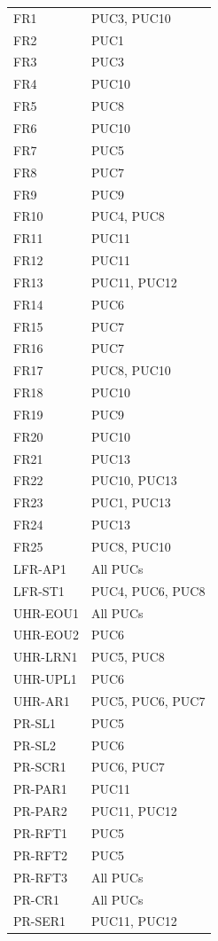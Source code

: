 \documentclass[12pt]{article}
\begin{document}
\begin{longtable}{p{2.5cm}p{11cm}}
    FR1 & PUC3, PUC10 \\
    FR2 & PUC1 \\
    FR3 & PUC3 \\
    FR4 & PUC10 \\
    FR5 & PUC8 \\
    FR6 & PUC10 \\
    FR7 & PUC5 \\
    FR8 & PUC7 \\
    FR9 & PUC9 \\
    FR10 & PUC4, PUC8 \\
    FR11 & PUC11 \\
    FR12 & PUC11 \\
    FR13 & PUC11, PUC12 \\
    FR14 & PUC6 \\
    FR15 & PUC7 \\
    FR16 & PUC7 \\
    FR17 & PUC8, PUC10 \\
    FR18 & PUC10 \\
    FR19 & PUC9 \\
    FR20 & PUC10 \\
    FR21 & PUC13 \\
    FR22 & PUC10, PUC13 \\
    FR23 & PUC1, PUC13 \\
    FR24 & PUC13 \\
    FR25 & PUC8, PUC10 \\
    LFR-AP1 & All PUCs \\
    LFR-ST1 & PUC4, PUC6, PUC8 \\
    UHR-EOU1 & All PUCs \\
    UHR-EOU2 & PUC6 \\
    UHR-LRN1 & PUC5, PUC8 \\
    UHR-UPL1 & PUC6 \\
    UHR-AR1 & PUC5, PUC6, PUC7 \\
    PR-SL1 & PUC5 \\
    PR-SL2 & PUC6 \\
    PR-SCR1 & PUC6, PUC7 \\
    PR-PAR1 & PUC11 \\
    PR-PAR2 & PUC11, PUC12 \\
    PR-RFT1 & PUC5 \\
    PR-RFT2 & PUC5 \\
    PR-RFT3 & All PUCs \\
    PR-CR1 & All PUCs \\
    PR-SER1 & PUC11, PUC12 \\

\end{longtable}
\end{document}
